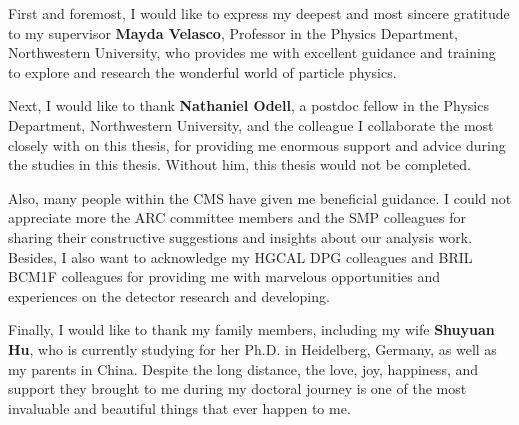\acknowledgements

First and foremost, I would like to express my deepest and most sincere gratitude to my supervisor \textbf{Mayda Velasco}, Professor in the Physics Department, Northwestern University, who provides me with excellent guidance and training to explore and research the wonderful world of particle physics. 

Next, I would like to thank \textbf{Nathaniel Odell}, a postdoc fellow in the Physics Department, Northwestern University, and the colleague I collaborate the most closely with on this thesis, for providing me enormous support and advice during the studies in this thesis. Without him, this thesis would not be completed. 

Also, many people within the CMS have given me beneficial guidance. I could not appreciate more the ARC committee members and the SMP colleagues for sharing their constructive suggestions and insights about our analysis work. Besides, I also want to acknowledge my HGCAL DPG colleagues and BRIL BCM1F colleagues for providing me with marvelous opportunities and experiences on the detector research and developing.

Finally, I would like to thank my family members, including my wife \textbf{Shuyuan Hu}, who is currently studying for her Ph.D. in Heidelberg, Germany, as well as my parents in China. Despite the long distance, the love, joy, happiness, and support they brought to me during my doctoral journey is one of the most invaluable and beautiful things that ever happen to me.